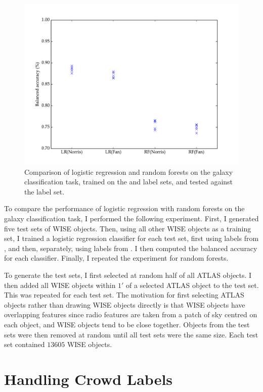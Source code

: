   \begin{figure}[!ht]
    \centering
    \includegraphics[width=\textwidth]{images/experiments/lr_rf}
    \caption{Comparison of logistic regression and random forests on the galaxy classification task, trained on the \citet{norris06} and \citet{fan15} label sets, and tested against the \citet{norris06} label set.}
  \end{figure}

  To compare the performance of logistic regression with random forests on the galaxy classification task, I performed the following experiment. First, I generated five test sets of WISE objects. Then, using all other WISE objects as a training set, I trained a logistic regression classifier for each test set, first using labels from \citet{norris06}, and then, separately, using labels from \citet{fan15}. I then computed the balanced accuracy for each classifier. Finally, I repeated the experiment for random forests.

  To generate the test sets, I first selected at random half of all ATLAS objects. I then added all WISE objects within $1'$ of a selected ATLAS object to the test set. This was repeated for each test set. The motivation for first selecting ATLAS objects rather than drawing WISE objects directly is that WISE objects have overlapping features since radio features are taken from a patch of sky centred on each object, and WISE objects tend to be close together. Objects from the test sets were then removed at random until all test sets were the same size. Each test set contained $13605$ WISE objects.

\section{Handling Crowd Labels}
\label{sec:rgz-crowd-labels}

